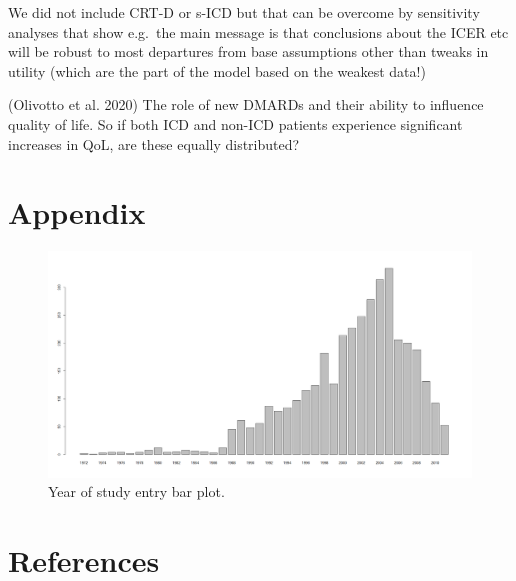 \documentclass[
]{article}
\begin{document}
We did not include CRT-D or s-ICD but that can be overcome by sensitivity analyses that show e.g.~the main message is that conclusions about the ICER etc will be robust to most departures from base assumptions other than tweaks in utility (which are the part of the model based on the weakest data!)

(Olivotto et al. 2020) The role of new DMARDs and their ability to influence quality of life.
So if both ICD and non-ICD patients experience significant increases in QoL, are these equally distributed?

\hypertarget{appendix}{%
\section{Appendix}\label{appendix}}

\begin{figure}

{\centering \includegraphics[width=0.8\linewidth]{../../images/year_of_entry_barplot} 

}

\caption{Year of study entry bar plot.}\label{fig:barplot}
\end{figure}

\hypertarget{references}{%
\section*{References}\label{references}}
\end{document}

